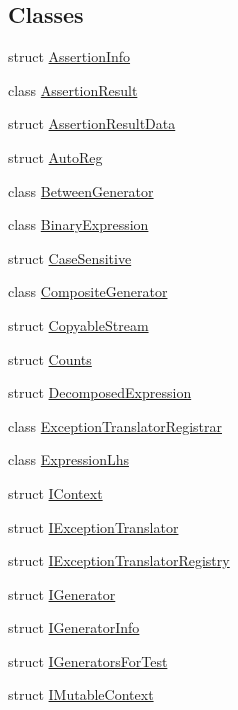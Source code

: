 \subsection*{Classes}
\begin{DoxyCompactItemize}
\item 
struct \hyperlink{struct_catch_1_1_assertion_info}{Assertion\+Info}
\item 
class \hyperlink{class_catch_1_1_assertion_result}{Assertion\+Result}
\item 
struct \hyperlink{struct_catch_1_1_assertion_result_data}{Assertion\+Result\+Data}
\item 
struct \hyperlink{struct_catch_1_1_auto_reg}{Auto\+Reg}
\item 
class \hyperlink{class_catch_1_1_between_generator}{Between\+Generator}
\item 
class \hyperlink{class_catch_1_1_binary_expression}{Binary\+Expression}
\item 
struct \hyperlink{struct_catch_1_1_case_sensitive}{Case\+Sensitive}
\item 
class \hyperlink{class_catch_1_1_composite_generator}{Composite\+Generator}
\item 
struct \hyperlink{struct_catch_1_1_copyable_stream}{Copyable\+Stream}
\item 
struct \hyperlink{struct_catch_1_1_counts}{Counts}
\item 
struct \hyperlink{struct_catch_1_1_decomposed_expression}{Decomposed\+Expression}
\item 
class \hyperlink{class_catch_1_1_exception_translator_registrar}{Exception\+Translator\+Registrar}
\item 
class \hyperlink{class_catch_1_1_expression_lhs}{Expression\+Lhs}
\item 
struct \hyperlink{struct_catch_1_1_i_context}{I\+Context}
\item 
struct \hyperlink{struct_catch_1_1_i_exception_translator}{I\+Exception\+Translator}
\item 
struct \hyperlink{struct_catch_1_1_i_exception_translator_registry}{I\+Exception\+Translator\+Registry}
\item 
struct \hyperlink{struct_catch_1_1_i_generator}{I\+Generator}
\item 
struct \hyperlink{struct_catch_1_1_i_generator_info}{I\+Generator\+Info}
\item 
struct \hyperlink{struct_catch_1_1_i_generators_for_test}{I\+Generators\+For\+Test}
\item 
struct \hyperlink{struct_catch_1_1_i_mutable_context}{I\+Mutable\+Context}

\end{DoxyCompactItemize}
